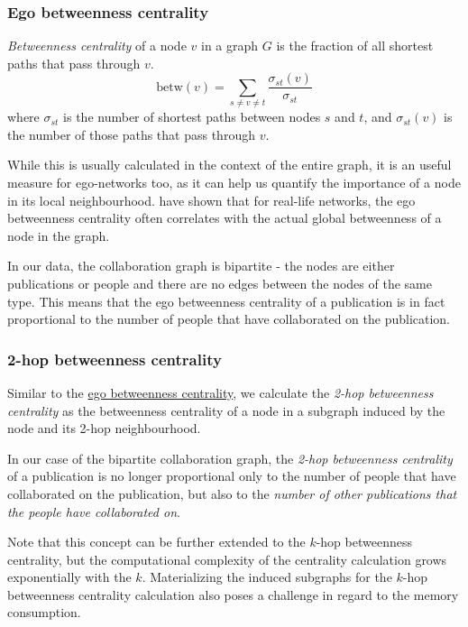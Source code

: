 \subsubsection{Ego betweenness centrality}\label{ego-betweenness}

\textit{Betweenness centrality} of a node $v$ in a graph $G$ is the fraction of all shortest paths that pass through $v$.
$$
\text{betw}(v) = \sum_{s \neq v \neq t} \frac{\sigma_{st}(v)}{\sigma_{st}}
$$
where $\sigma_{st}$ is the number of shortest paths between nodes $s$ and $t$, and $\sigma_{st}(v)$ is the number of those paths that pass through $v$.

While this is usually calculated in the context of the entire graph, it is an useful measure for ego-networks too, as it can help us quantify the importance of a node in its local neighbourhood. 
\cite{egonetworkbetweenness} have shown that for real-life networks, the ego betweenness centrality often correlates with the actual global betweenness of a node in the graph.

In our data, the collaboration graph is bipartite - the nodes are either publications or people and there are no edges between the nodes of the same type.
This means that the ego betweenness centrality of a publication is in fact proportional to the number of people that have collaborated on the publication.

\subsubsection{2-hop betweenness centrality}
Similar to the \hyperref[ego-betweenness]{ego betweenness centrality}, we calculate the \textit{2-hop betweenness centrality} as the betweenness centrality of a node 
in a subgraph induced by the node and its 2-hop neighbourhood.

In our case of the bipartite collaboration graph, the \textit{2-hop betweenness centrality} of a publication is no longer proportional only to the number of people that have collaborated on the publication,
but also to the \textit{number of other publications that the people have collaborated on}.

Note that this concept can be further extended to the $k$-hop betweenness centrality, but the computational complexity of the centrality calculation grows exponentially with the $k$.
Materializing the induced subgraphs for the $k$-hop betweenness centrality calculation also poses a challenge in regard to the memory consumption. 

